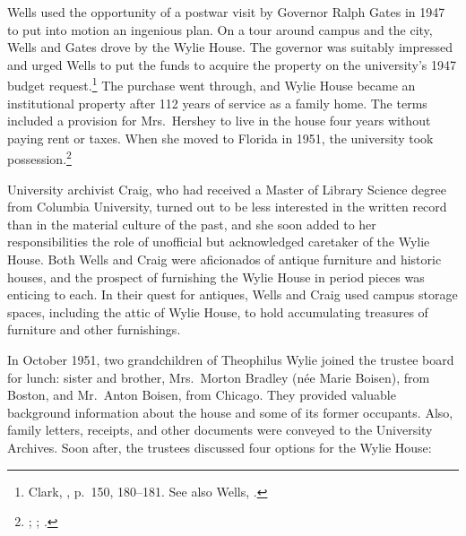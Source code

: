 \documentclass[
  american,
  letterpaper,
]{scrreprt}
\begin{document}
Wells used the opportunity of a postwar visit by Governor Ralph Gates in
1947 to put into motion an ingenious plan. On a tour around campus and
the city, Wells and Gates drove by the Wylie House. The governor was
suitably impressed and urged Wells to put the funds to acquire the
property on the university's 1947 budget request.\footnote{Clark,
  , p.~150,
  180--181. See also Wells, .} The purchase went through, and
Wylie House became an institutional property after 112 years of service
as a family home. The terms included a provision for Mrs.~Hershey to
live in the house four years without paying rent or taxes. When she
moved to Florida in 1951, the university took possession.\footnote{;
  ;
  .}

University archivist Craig, who had received a Master of Library Science
degree from Columbia University, turned out to be less interested in the
written record than in the material culture of the past, and she soon
added to her responsibilities the role of unofficial but acknowledged
caretaker of the Wylie House. Both Wells and Craig were aficionados of
antique furniture and historic houses, and the prospect of furnishing
the Wylie House in period pieces was enticing to each. In their quest
for antiques, Wells and Craig used campus storage spaces, including the
attic of Wylie House, to hold accumulating treasures of furniture and
other furnishings.

In October 1951, two grandchildren of Theophilus Wylie joined the
trustee board for lunch: sister and brother, Mrs.~Morton Bradley (née
Marie Boisen), from Boston, and Mr.~Anton Boisen, from Chicago. They
provided valuable background information about the house and some of its
former occupants. Also, family letters, receipts, and other documents
were conveyed to the University Archives. Soon after, the trustees
discussed four options for the Wylie House:
\end{document}
